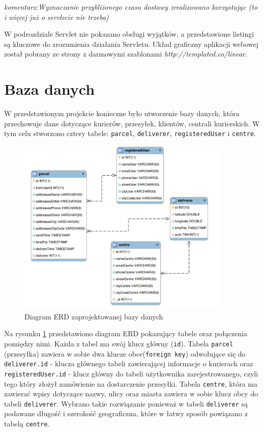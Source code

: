 \documentclass[eng,printmode,oneside]{mgr}
\begin{document}
\emph{\color{komentarz}komentarz:Wyznaczanie przybliżonego czasu dostawy
zrealizowano korzystając (to i więcej już o servlecie nie trzeba)}

W podrozdziale Servlet nie pokazano obsługi wyjątków, a przedstawione listingi
są kluczowe do zrozumienia działania Servletu. Układ graficzny aplikacji webowej
został pobrany ze strony z darmowymi szablonami
{\textit{http://templated.co/linear}}.

\newpage
\section{Baza danych}

W przedstawionym projekcie konieczne było utworzenie bazy danych, która
przechowuje dane dotyczące kurierów, przesyłek, klientów, centrali kurierskich.
W tym celu stworzono cztery tabele: \texttt{parcel}, \texttt{deliverer},
\texttt{registeredUser} i \texttt{centre}.

\begin{figure}[ht!]
\centering
\includegraphics[width=0.9\textwidth]{ERD.png}
\caption{Diagram ERD zaprojektowanej bazy danych}
\label{fig:ERD}
\end{figure}

Na rysunku \ref{fig:ERD} przedstawiono diagram ERD pokazujący tabele oraz
połączenia pomiędzy nimi. Każda z tabel ma swój klucz główny (\texttt{id}).
Tabela \texttt{parcel} (przesyłka) zawiera w sobie dwa klucze obce(\texttt{foreign
key}) odwołujące się do \texttt{deliverer.id} - klucza głównego
tabeli zawierającej informacje o kurierach oraz \texttt{registeredUser.id} -
klucz główny do tabeli użytkownika zarejestrowanego, czyli tego który złożył
zamówienie na dostarczenie przesyłki. Tabela \texttt{centre}, która ma zawierać
wpisy dotyczące nazwy, ulicy oraz miasta zawiera w sobie klucz obcy do tabeli
\texttt{deliverer}. Wybrano takie rozwiązanie ponieważ w tabeli
\texttt{deliverer} są podawane długość i szerokość geograficzna, które w łatwy sposób powiązano z tabelą \texttt{centre}.
\end{document}
